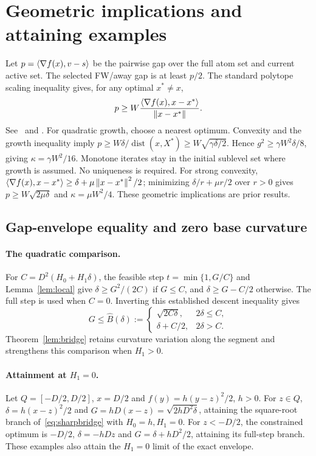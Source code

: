 \section{Geometric implications and attaining examples}
\label{app:geometry}
Let $p=\left\langle\nabla f(x),v-s\right\rangle$ be the pairwise gap over the full
atom set and current active set. The selected FW/away gap is at
least $p/2$. The standard polytope scaling inequality gives, for
any optimal $x^*\ne x$,
\[
 p\ge W\frac{\left\langle\nabla f(x),x-x^*\right\rangle}{\left\|x-x^*\right\|}.
\]
See~\cite[Theorem 3]{lacostejaggi} and
\cite[Lemmas 3.4 and 3.6]{restartfw}. For quadratic growth, choose
a nearest optimum. Convexity and the growth inequality imply
$p\ge W\delta/\operatorname{dist}(x,X^*)
\ge W\sqrt{\gamma\delta/2}$. Hence
$g^2\ge\gamma W^2\delta/8$, giving $\kappa=\gamma W^2/16$.
Monotone iterates stay in the initial sublevel set where growth is
assumed. No uniqueness is required. For strong convexity,
$\left\langle\nabla f(x),x-x^*\right\rangle\ge\delta+\mu\left\|x-x^*\right\|^2/2$;
minimizing $\delta/r+\mu r/2$ over $r>0$ gives
$p\ge W\sqrt{2\mu\delta}$ and $\kappa=\mu W^2/4$.
These geometric implications are prior results.

\subsection{Gap-envelope equality and zero base curvature}
\label{app:bridge}
\paragraph{The quadratic comparison.}
For $C=D^2(H_0+H_1\delta)$, the feasible step
$t=\min\{1,G/C\}$ and Lemma~\ref{lem:local} give
$\delta\ge G^2/(2C)$ if $G\le C$, and
$\delta\ge G-C/2$ otherwise. The full step is used when $C=0$.
Inverting this established descent inequality gives
\begin{equation}\label{eq:sharpbridge}
 G\le\widehat B(\delta):=
 \begin{cases}\sqrt{2C\delta},&2\delta\le C,\\
 \delta+C/2,&2\delta>C.\end{cases}
\end{equation}
Theorem~\ref{lem:bridge} retains curvature variation along the
segment and strengthens this comparison when $H_1>0$.

\paragraph{Attainment at $H_1=0$.}
Let $Q=[-D/2,D/2]$, $x=D/2$ and $f(y)=h(y-z)^2/2$, $h>0$.
For $z\in Q$, $\delta=h(x-z)^2/2$ and
$G=hD(x-z)=\sqrt{2hD^2\delta}$, attaining the square-root branch
of~\eqref{eq:sharpbridge} with $H_0=h,H_1=0$.
For $z<-D/2$, the constrained optimum is $-D/2$,
$\delta=-hDz$ and $G=\delta+hD^2/2$, attaining its full-step branch.
These examples also attain the $H_1=0$ limit of the exact envelope.

